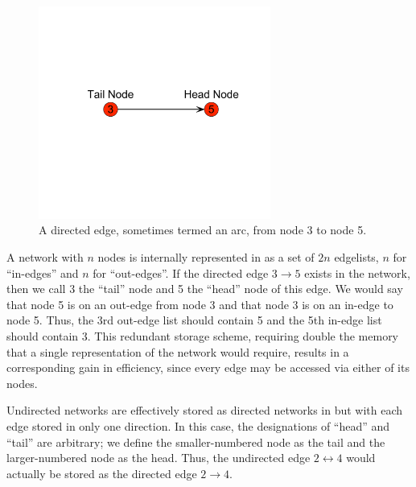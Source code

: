 \documentclass[nojss]{jss}
\begin{document}
\begin{figure}[h!]
\centerline{\includegraphics[width=3in]{twonode.pdf}}
\caption{A directed edge, sometimes termed an arc, from
node 3 to node 5.}\label{directededge}
\end{figure}

A network
with $n$ nodes is internally represented in  as a set of $2n$ edgelists,
$n$ for ``in-edges'' and $n$ for ``out-edges''.  If the directed edge
$3\!\!\longrightarrow\!\!5$ exists in the network,
then we call 3 the ``tail'' node and 5 the ``head'' node of this edge.  We would say that node 5 is
on an out-edge from node 3 and that node 3 is on an in-edge to node 5.  Thus, the 3rd out-edge list
should contain 5 and the 5th in-edge list should contain 3.  This redundant storage
scheme, requiring double the memory that a single representation of the network
would require, results in a corresponding gain in efficiency, since every edge
may be accessed via either of its nodes.

Undirected networks are effectively stored as directed networks in  but with
each edge stored in only one direction.
In this case, the
designations of ``head'' and ``tail'' are arbitrary; we define the smaller-numbered node as the tail
and the larger-numbered node as the head. Thus, the undirected edge
$2\!\!\longleftrightarrow\!\!4$ would actually be stored as the directed edge
$2\!\!\longrightarrow\!\!4$.
\end{document}
